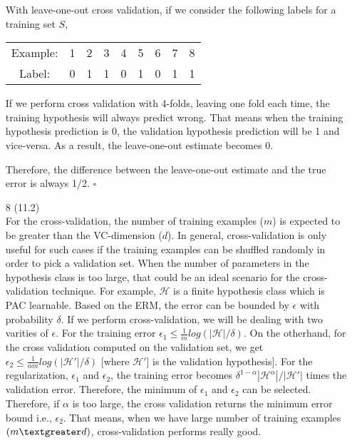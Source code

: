 \documentclass[12pt,letterpaper]{article}
\begin{document}
\begin{enumerate}
With leave-one-out cross validation, if we consider the following labels for a training set $S$,


\begin{table}[h]
\centering
\begin{tabular}{c c c c c c c c c}
    Example: & 1 & 2 & 3 & 4 & 5 & 6 & 7 & 8\\
    Label: & 0 & 1 & 1 & 0 & 1 & 0 & 1 & 1 
    
\end{tabular}
\end{table}

If we perform cross validation with 4-folds, leaving one fold each time, the training hypothesis will always predict wrong. That means when the training hypothesis prediction is 0, the validation hypothesis prediction will be 1 and vice-versa. As a result, the leave-one-out estimate becomes 0.

Therefore, the difference between the leave-one-out estimate and the true error is always 1/2. $\square$

\newpage

\item[8] (11.2) \\
For the cross-validation, the number of training examples ($m$) is expected to be greater than the VC-dimension ($d$). In general, cross-validation is only useful for such cases if the training examples can be shuffled randomly in order to pick a validation set. When the number of parameters in the hypothesis class is too large, that could be an ideal scenario for the cross-validation technique. For example, $\mathcal{H}$ is a finite hypothesis class which is PAC learnable. Based on the ERM, the error can be bounded by $\epsilon$ with probability $\delta$.  If we perform cross-validation, we will be dealing with two varities of $\epsilon$. For the training error  
$\epsilon_1 \leq \frac{1}{m}log(|\mathcal{H}|/\delta)$. On the otherhand, for the cross validation computed on the validation set,  we get $\epsilon_2 \leq \frac{1}{\alpha m}log(|\mathcal{H}'|/\delta)$ [where $\mathcal{H}'$] is the validation hypothesis]. For the regularization, $\epsilon_1$ and $\epsilon_2$, the training error becomes $\delta^{1 - \alpha}|\mathcal{H}^\alpha| / |\mathcal{H}'|$ times the validation error. Therefore, the minimum of $\epsilon_1$ and $\epsilon_2$ can be selected. Therefore, if $\alpha$ is too large, the cross validation returns the minimum error bound i.e., $\epsilon_2$. That means, when we have large number of training examples $(m \textgreater d)$, cross-validation performs really good.


\end{enumerate}
\end{document}
